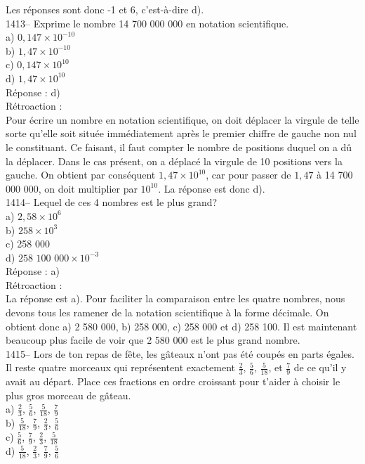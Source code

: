 Les r\'eponses sont donc -1 et 6, c'est-\`a-dire d).\\

1413-- Exprime le nombre 14 700 000 000 en notation scientifique.\\
a) $0,147\times10^{-10}$\\
b) $1,47\times10^{-10}$\\
c) $0,147\times10^{10}$\\
d) $1,47\times10^{10}$\\

R\'eponse : d)\\

R\'etroaction :\\
Pour \'ecrire un nombre en notation scientifique, on doit d\'eplacer
la virgule de telle sorte qu'elle soit situ\'ee imm\'ediatement
apr\`es le premier chiffre de gauche non nul le constituant. Ce
faisant, il faut compter le nombre de positions duquel on a d\^u la
d\'eplacer. Dans le cas pr\'esent, on a d\'eplac\'e la virgule de 10
positions vers la gauche. On obtient par cons\'equent
$1,47\times10^{10}$, car pour passer de $1,47$ \`a 14 700 000 000,
on doit
multiplier par $10^{10}$. La r\'eponse est donc d).\\

1414-- Lequel de ces 4 nombres est le plus grand?\\
a) $2,58\times10^6$\\
b) $258\times10^3$\\
c) 258 000\\
d) ${\textrm{258 100 000}}\times10^{-3}$\\

R\'eponse : a)\\

R\'etroaction :\\La r\'eponse est a). Pour faciliter la comparaison
entre les quatre nombres, nous devons tous les ramener de la
notation scientifique \`a la forme d\'ecimale. \vskip 10pt \noindent
On obtient donc a) 2 580 000, b) 258 000, c) 258 000 et d) 258 100.
Il est maintenant beaucoup plus facile de voir que 2 580 000 est le
plus grand nombre. \\


1415-- Lors de ton repas de f\^ete, les g\^ateaux n'ont pas \'et\'e
coup\'es en parts \'egales. Il reste quatre morceaux qui
repr\'esentent exactement $\frac{2}{3}$, $\frac{5}{6}$,
$\frac{5}{18}$, et $\frac{7}{9}$ de ce qu'il y avait au d\'epart.
Place ces
fractions en ordre croissant pour t'aider \`a choisir le plus gros morceau
de g\^ateau.\\[3mm]
a) $\frac{2}{3}$,  $\frac{5}{6}$,  $\frac{5}{18}$,  $\frac{7}{9}$\\[3mm]
b) $\frac{5}{18}$,  $\frac{7}{9}$,   $\frac{2}{3}$,  $\frac{5}{6}$\\[3mm]
c) $\frac{5}{6}$,   $\frac{7}{9}$,  $\frac{2}{3}$,  $\frac{5}{18}$\\[3mm]
d) $\frac{5}{18}$,  $\frac{2}{3}$,   $\frac{7}{9}$,  $\frac{5}{6}$\\

